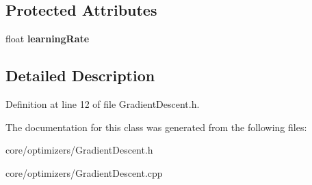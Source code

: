 \subsection*{Protected Attributes}
\begin{DoxyCompactItemize}
\item 
\mbox{\label{classathena_1_1core_1_1optimizers_1_1_gradient_descent_a40fd65d38f6804e2e8c7109f7cd27e67}} 
float {\bfseries learning\+Rate}
\end{DoxyCompactItemize}


\subsection{Detailed Description}


Definition at line 12 of file Gradient\+Descent.\+h.



The documentation for this class was generated from the following files\+:\begin{DoxyCompactItemize}
\item 
core/optimizers/Gradient\+Descent.\+h\item 
core/optimizers/Gradient\+Descent.\+cpp\end{DoxyCompactItemize}
